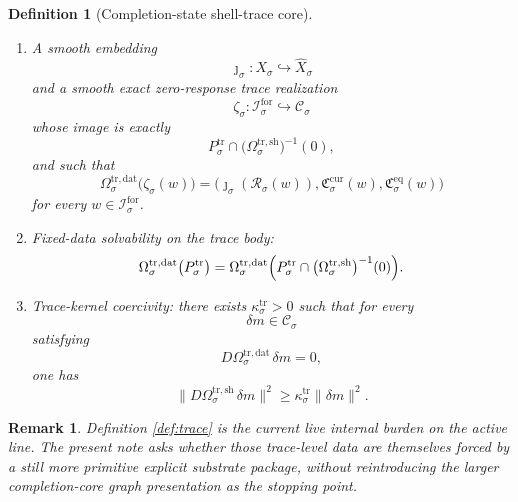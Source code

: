 \documentclass[11pt]{article}
\newcommand{\ForSpace}[1]{\mathcal I_{#1}^{\mathrm{for}}}
\newcommand{\Reduction}[1]{\mathcal R_{#1}}
\newcommand{\CurrentCarrier}[1]{\mathfrak C_{#1}^{\mathrm{cur}}}
\newcommand{\EqCarrier}[1]{\mathfrak C_{#1}^{\mathrm{eq}}}
\newcommand{\VisibleAffine}[1]{\widehat X_{#1}}
\newcommand{\GapBody}[1]{D_{#1}}
\newcommand{\HiddenOperator}[1]{K_{#1}^{\mathrm{hid}}}
\newcommand{\CoreState}[1]{\mathcal C_{#1}}
\newcommand{\TraceBody}[1]{P_{#1}^{\mathrm{tr}}}
\newcommand{\TraceDataMap}[1]{\Omega_{#1}^{\mathrm{tr,dat}}}
\newcommand{\TraceShellMap}[1]{\Omega_{#1}^{\mathrm{tr,sh}}}
\newcommand{\TraceSym}[1]{\mathbb K_{#1}^{\mathrm{tr}}}
\newcommand{\TraceTime}[1]{\tau_{#1}^{\mathrm{tr}}}
\newcommand{\TraceEmbed}[1]{\zeta_{#1}}
\newtheorem{definition}{Definition}
\newtheorem{remark}{Remark}
\begin{document}
\begin{definition}[Completion-state shell-trace core]
\begin{enumerate}
    \[
    \TraceBody{\sigma}\cap
    \bigl(\TraceShellMap{\sigma}\bigr)^{-1}(0),
    \]
    the hidden body \(\GapBody{\sigma}\), and \(\HiddenOperator{\sigma}\), and satisfying
    \[
    \TraceDataMap{\sigma}(g_{\mathrm{st}}m)
    =
    g_{\mathrm{dat}}\TraceDataMap{\sigma}(m),
    \qquad
    \TraceShellMap{\sigma}(g_{\mathrm{st}}m)
    =
    g_{\mathrm{sh}}\TraceShellMap{\sigma}(m)
    \]
    for every \(m\in\CoreState{\sigma}\) and every
    \[
    (g_{\mathrm{st}},g_{\mathrm{dat}},g_{\mathrm{sh}},g_{\mathrm{hid}})
    \in\TraceSym{\sigma},
    \]
    with the analogous intertwining equalities for the components of \(\TraceTime{\sigma}\).
    \item A smooth embedding
    \[
    \jmath_{\sigma}:X_{\sigma}\hookrightarrow\VisibleAffine{\sigma}
    \]
    and a smooth exact zero-response trace realization
    \[
    \TraceEmbed{\sigma}:\ForSpace{\sigma}\hookrightarrow\CoreState{\sigma}
    \]
    whose image is exactly
    \[
    \TraceBody{\sigma}\cap
    \bigl(\TraceShellMap{\sigma}\bigr)^{-1}(0),
    \]
    and such that
    \begin{equation}
    \TraceDataMap{\sigma}\bigl(\TraceEmbed{\sigma}(w)\bigr)
    =
    \bigl(
    \jmath_{\sigma}(\Reduction{\sigma}(w)),
    \CurrentCarrier{\sigma}(w),
    \EqCarrier{\sigma}(w)
    \bigr)
    \label{eq:tracecompat}
    \end{equation}
    for every \(w\in\ForSpace{\sigma}\).
    \item Fixed-data solvability on the trace body:
    \begin{equation}
    \TraceDataMap{\sigma}\bigl(\TraceBody{\sigma}\bigr)
    =
    \TraceDataMap{\sigma}\Bigl(
    \TraceBody{\sigma}\cap
    \bigl(\TraceShellMap{\sigma}\bigr)^{-1}(0)
    \Bigr).
    \label{eq:tracesolvability}
    \end{equation}
    \item Trace-kernel coercivity: there exists \(\kappa_{\sigma}^{\mathrm{tr}}>0\) such that for every
    \[
    \delta m\in\CoreState{\sigma}
    \]
    satisfying
    \[
    D\TraceDataMap{\sigma}\,\delta m=0,
    \]
    one has
    \begin{equation}
    \bigl\|
    D\TraceShellMap{\sigma}\,\delta m
    \bigr\|^{2}
    \ge
    \kappa_{\sigma}^{\mathrm{tr}}\|\delta m\|^{2}.
    \label{eq:tracecoercive}
    \end{equation}
\end{enumerate}
\end{definition}

\begin{remark}
Definition \ref{def:trace} is the current live internal burden on the active line. The present note asks whether those trace-level data are themselves forced by a still more primitive explicit substrate package, without reintroducing the larger completion-core graph presentation as the stopping point.
\end{remark}
\end{document}
